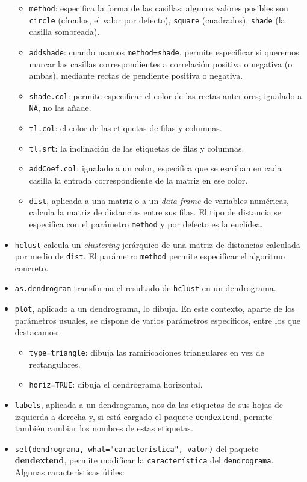 \documentclass[
]{book}
\theoremstyle{definition}
\theoremstyle{definition}
\theoremstyle{definition}
\theoremstyle{remark}
\begin{document}
\begin{itemize}
  \begin{itemize}
  \item
    \texttt{method}: especifica la forma de las casillas; algunos valores posibles son \texttt{circle} (círculos, el valor por defecto), \texttt{square} (cuadrados), \texttt{shade} (la casilla sombreada).
  \item
    \texttt{addshade}: cuando usamos \texttt{method=shade}, permite especificar si queremos marcar las casillas correspondientes a correlación positiva o negativa (o ambas), mediante rectas de pendiente positiva o negativa.
  \item
    \texttt{shade.col}: permite especificar el color de las rectas anteriores; igualado a \texttt{NA}, no las añade.
  \item
    \texttt{tl.col}: el color de las etiquetas de filas y columnas.
  \item
    \texttt{tl.srt}: la inclinación de las etiquetas de filas y columnas.
  \item
    \texttt{addCoef.col}: igualado a un color, especifica que se escriban en cada casilla la entrada correspondiente de la matriz en ese color.
  \item
    \texttt{dist}, aplicada a una matriz o a un \emph{data frame} de variables numéricas, calcula la matriz de distancias entre sus filas. El tipo de distancia se especifica con el parámetro \texttt{method} y por defecto es la euclídea.
  \end{itemize}
\item
  \texttt{hclust} calcula un \emph{clustering} jerárquico de una matriz de distancias calculada por medio de \texttt{dist}.
  El parámetro \texttt{method} permite especificar el algoritmo concreto.
\item
  \texttt{as.dendrogram} transforma el resultado de \texttt{hclust} en un dendrograma.
\item
  \texttt{plot}, aplicado a un dendrograma, lo dibuja. En este contexto, aparte de los parámetros usuales, se dispone de varios parámetros específicos, entre los que destacamos:

  \begin{itemize}
  \item
    \texttt{type=triangle}: dibuja las ramificaciones triangulares en vez de rectangulares.
  \item
    \texttt{horiz=TRUE}: dibuja el dendrograma horizontal.
  \end{itemize}
\item
  \texttt{labels}, aplicada a un dendrograma, nos da las etiquetas de sus hojas de izquierda a derecha y, si está cargado el paquete \texttt{dendextend}, permite también cambiar los nombres de estas etiquetas.
\item
  \texttt{set(dendrograma,\ what="característica",\ valor)} del paquete
  \textbf{dendextend}, permite modificar la \texttt{característica} del \texttt{dendrograma}. Algunas características útiles:


\end{itemize}
\end{document}

